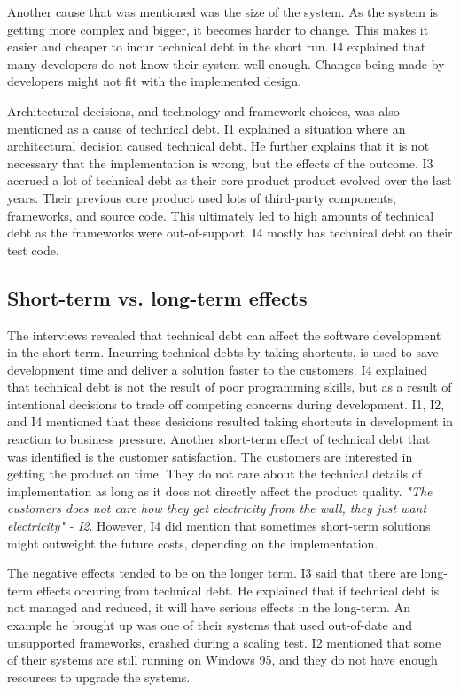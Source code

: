 Another cause that was mentioned was the size of the system. As the system is getting more complex and bigger, it becomes harder to change. This makes it easier and cheaper to incur technical debt in the short run. I4 explained that many developers do not know their system well enough. Changes being made by developers might not fit with the implemented design.

Architectural decisions, and technology and framework choices, was also mentioned as a cause of technical debt. I1 explained a situation where an architectural decision caused technical debt. He further explains that it is not necessary that the implementation is wrong, but the effects of the outcome. I3 accrued a lot of technical debt as their core product product evolved over the last years. Their previous core product used lots of third-party components, frameworks, and source code. This ultimately led to high amounts of technical debt as the frameworks were out-of-support. I4 mostly has technical debt on their test code.


\subsection{Short-term vs. long-term effects}
The interviews revealed that technical debt can affect the software development in the short-term. Incurring technical debts by taking shortcuts, is used to save development time and deliver a solution faster to the customers. I4 explained that technical debt is not the result of poor programming skills, but as a result of intentional decisions to trade off competing concerns during development. I1, I2, and I4 mentioned that these desicions resulted taking shortcuts in development in reaction to business pressure. Another short-term effect of technical debt that was identified is the customer satisfaction. The customers are interested in getting the product on time. They do not care about the technical details of implementation as long as it does not directly affect the product quality. \textit{"The customers does not care how they get electricity from the wall, they just want electricity" - I2}. However, I4 did mention that sometimes short-term solutions might outweight the future costs, depending on the implementation.

The negative effects tended to be on the longer term. I3 said that there are long-term effects occuring from technical debt. He explained that if technical debt is not managed and reduced, it will have serious effects in the long-term. An example he brought up was one of their systems that used out-of-date and unsupported frameworks, crashed during a scaling test. I2 mentioned that some of their systems are still running on Windows 95, and they do not have enough resources to upgrade the systems. 




